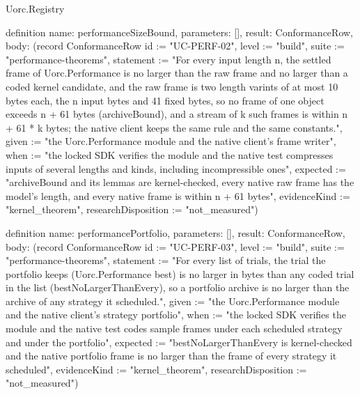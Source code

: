 \begin{lexlean}{Uorc.Registry}
\begin{semanticmodule}
definition{
  name: performanceSizeBound,
  parameters: [],
  result: ConformanceRow,
  body: (record ConformanceRow {id := "UC-PERF-02", level := "build", suite := "performance-theorems", statement := "For every input length n, the settled frame of Uorc.Performance is no larger than the raw frame and no larger than a coded kernel candidate, and the raw frame is two length varints of at most 10 bytes each, the n input bytes and 41 fixed bytes, so no frame of one object exceeds n + 61 bytes (archiveBound), and a stream of k such frames is within n + 61 * k bytes; the native client keeps the same rule and the same constants.", given := "the Uorc.Performance module and the native client's frame writer", when := "the locked SDK verifies the module and the native test compresses inputs of several lengths and kinds, including incompressible ones", expected := "archiveBound and its lemmas are kernel-checked, every native raw frame has the model's length, and every native frame is within n + 61 bytes", evidenceKind := "kernel_theorem", researchDisposition := "not_measured"})
}

definition{
  name: performancePortfolio,
  parameters: [],
  result: ConformanceRow,
  body: (record ConformanceRow {id := "UC-PERF-03", level := "build", suite := "performance-theorems", statement := "For every list of trials, the trial the portfolio keeps (Uorc.Performance best) is no larger in bytes than any coded trial in the list (bestNoLargerThanEvery), so a portfolio archive is no larger than the archive of any strategy it scheduled.", given := "the Uorc.Performance module and the native client's strategy portfolio", when := "the locked SDK verifies the module and the native test codes sample frames under each scheduled strategy and under the portfolio", expected := "bestNoLargerThanEvery is kernel-checked and the native portfolio frame is no larger than the frame of every strategy it scheduled", evidenceKind := "kernel_theorem", researchDisposition := "not_measured"})
}


\end{semanticmodule}
\end{lexlean}
